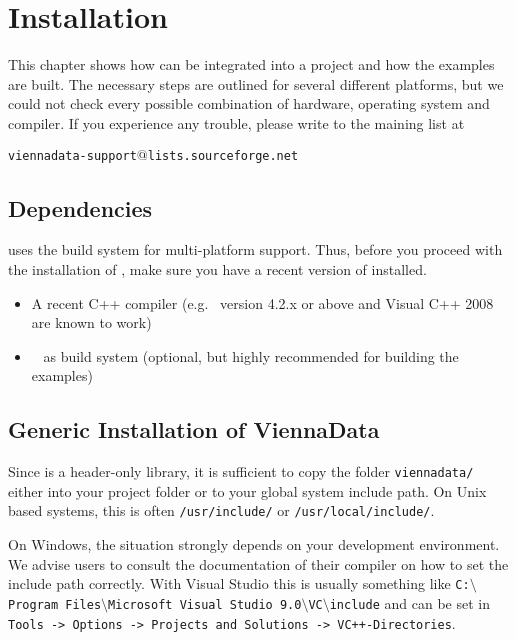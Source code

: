 \chapter{Installation}

This chapter shows how {\ViennaData} can be integrated into a project and how
the examples are built. The necessary steps are outlined for several different
platforms, but we could not check every possible combination of hardware,
operating system and compiler. If you experience any trouble, please write to
the maining list at \\
\begin{center}
\texttt{viennadata-support$@$lists.sourceforge.net} 
\end{center}


\section{Dependencies}
\label{dependencies}
{\ViennaData} uses the {\CMake} build system for multi-platform support.
Thus, before you proceed with the installation of {\ViennaData}, make sure you
have a recent version of {\CMake} installed.

\begin{itemize}
 \item A recent C++ compiler (e.g.~{\GCC} version 4.2.x or above and Visual C++
2008 are known to work)
 \item {\CMake}~\cite{cmake} as build system (optional, but highly recommended
for building the examples)
\end{itemize}


\section{Generic Installation of ViennaData} \label{sec:viennacl-installation}
Since {\ViennaData} is a header-only library, it is sufficient to copy the
folder
\lstinline|viennadata/| either into your project folder or to your global system
include path. On Unix based systems, this is often \lstinline|/usr/include/| or
\lstinline|/usr/local/include/|.

On Windows, the situation strongly depends on your development environment. We
advise users
to consult the documentation of their compiler on how to set the include
path correctly. With Visual Studio this is usually something like
\texttt{C:$\setminus$Program Files$\setminus$Microsoft Visual Studio
9.0$\setminus$VC$\setminus$include}
and can be set in \texttt{Tools -> Options -> Projects and Solutions ->
VC++-\-Directories}. 


